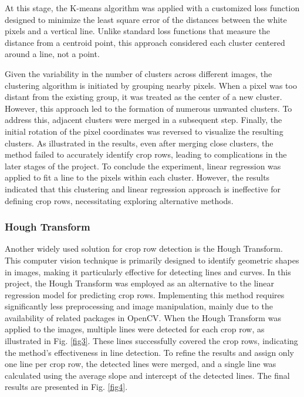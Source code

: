 \documentclass[conference]{IEEEtran}
\begin{document}
At this stage, the K-means algorithm was applied with a customized loss function designed to minimize the least square error of the distances between the white pixels and a vertical line. Unlike standard loss functions that measure the distance from a centroid point, this approach considered each cluster centered around a line, not a point.

Given the variability in the number of clusters across different images, the clustering algorithm is initiated by grouping nearby pixels. When a pixel was too distant from the existing group, it was treated as the center of a new cluster. However, this approach led to the formation of numerous unwanted clusters. To address this, adjacent clusters were merged in a subsequent step. Finally, the initial rotation of the pixel coordinates was reversed to visualize the resulting clusters. As illustrated in the results, even after merging close clusters, the method failed to accurately identify crop rows, leading to complications in the later stages of the project. To conclude the experiment, linear regression was applied to fit a line to the pixels within each cluster. However, the results indicated that this clustering and linear regression approach is ineffective for defining crop rows, necessitating exploring alternative methods.

\subsubsection{Hough Transform}\label{Hough Transform}
Another widely used solution for crop row detection is the Hough Transform. This computer vision technique is primarily designed to identify geometric shapes in images, making it particularly effective for detecting lines and curves. In this project, the Hough Transform was employed as an alternative to the linear regression model for predicting crop rows. Implementing this method requires significantly less preprocessing and image manipulation, mainly due to the availability of related packages in OpenCV. When the Hough Transform was applied to the images, multiple lines were detected for each crop row, as illustrated in Fig.
\ref{fig3}. These lines successfully covered the crop rows, indicating the method's effectiveness in line detection. To refine the results and assign only one line per crop row, the detected lines were merged, and a single line was calculated using the average slope and intercept of the detected lines. The final results are presented in Fig.
\ref{fig4}.
\end{document}
